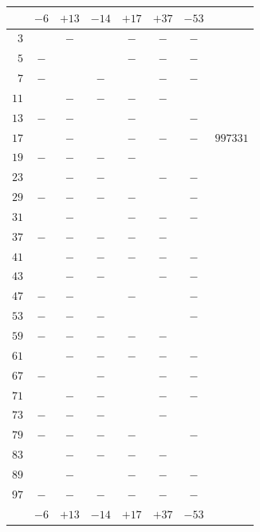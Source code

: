\documentclass[12pt,a4paper]{article}
\theoremstyle{plain}
\theoremstyle{definition}
\theoremstyle{remark}
\begin{document}
\begin{center}
\begin{tabular}{r|cccccc|c}
& $-6$ & $+13$ & $-14$ & $+17$ & $+37$ & $-53$ & \\
\hline
$3$ & & $-$ & & $-$ & $-$ & $-$ & \\
$5$ & $-$ & & & $-$ & $-$ & $-$ & \\
$7$ & $-$ & & $-$ & & $-$ & $-$ & \\
$11$ & & $-$ & $-$ & $-$ & $-$ & & \\
$13$ & $-$ & $-$ & & $-$ & & $-$ & \\
$17$ & & $-$ & & $-$ & $-$ & $-$ & $997331$\\
$19$ & $-$ & $-$ & $-$ & $-$ & & & \\
$23$ & & $-$ & $-$ & & $-$ & $-$ & \\
$29$ & $-$ & $-$ & $-$ & $-$ & & $-$ & \\
$31$ & & $-$ & & $-$ & $-$ & $-$ & \\
$37$ & $-$ & $-$ & $-$ & $-$ & $-$ & & \\
$41$ & & $-$ & $-$ & $-$ & $-$ & $-$ & \\
$43$ & & $-$ & $-$ & & $-$ & $-$ & \\
$47$ & $-$ & $-$ & & $-$ & & $-$ & \\
$53$ & $-$ & $-$ & $-$ & & & $-$ & \\
$59$ & $-$ & $-$ & $-$ & $-$ & $-$ & & \\
$61$ & & $-$ & $-$ & $-$ & $-$ & $-$ & \\
$67$ & $-$ & & $-$ & & $-$ & $-$ & \\
$71$ & & $-$ & $-$ & & $-$ & $-$ & \\
$73$ & $-$ & $-$ & $-$ & & $-$ & & \\
$79$ & $-$ & $-$ & $-$ & $-$ & & $-$ & \\
$83$ & & $-$ & $-$ & $-$ & $-$ & & \\
$89$ & & $-$ & & $-$ & $-$ & $-$ & \\
$97$ & $-$ & $-$ & $-$ & $-$ & $-$ & $-$ & \\
\hline
& $-6$ & $+13$ & $-14$ & $+17$ & $+37$ & $-53$ &
\end{tabular}
\end{center}
\end{document}

